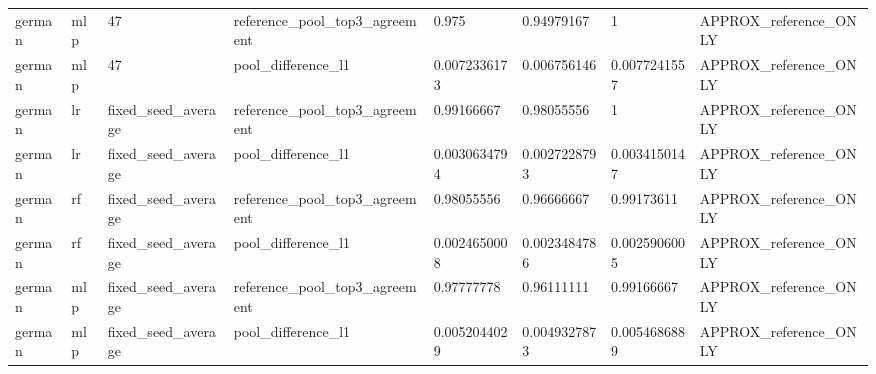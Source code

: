 \begin{tabular}{llllllll}
german & mlp & 47 & reference\_pool\_top3\_agreement & 0.975 & 0.94979167 & 1 & APPROX\_reference\_ONLY \\
german & mlp & 47 & pool\_difference\_l1 & 0.0072336173 & 0.006756146 & 0.0077241557 & APPROX\_reference\_ONLY \\
german & lr & fixed\_seed\_average & reference\_pool\_top3\_agreement & 0.99166667 & 0.98055556 & 1 & APPROX\_reference\_ONLY \\
german & lr & fixed\_seed\_average & pool\_difference\_l1 & 0.0030634794 & 0.0027228793 & 0.0034150147 & APPROX\_reference\_ONLY \\
german & rf & fixed\_seed\_average & reference\_pool\_top3\_agreement & 0.98055556 & 0.96666667 & 0.99173611 & APPROX\_reference\_ONLY \\
german & rf & fixed\_seed\_average & pool\_difference\_l1 & 0.0024650008 & 0.0023484786 & 0.0025906005 & APPROX\_reference\_ONLY \\
german & mlp & fixed\_seed\_average & reference\_pool\_top3\_agreement & 0.97777778 & 0.96111111 & 0.99166667 & APPROX\_reference\_ONLY \\
german & mlp & fixed\_seed\_average & pool\_difference\_l1 & 0.0052044029 & 0.0049327873 & 0.0054686889 & APPROX\_reference\_ONLY \\
\bottomrule
\end{tabular}
